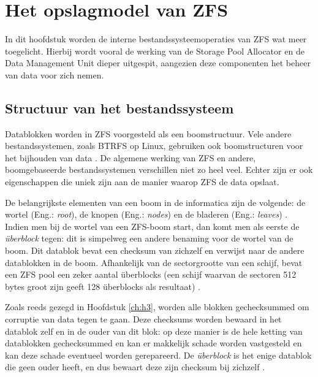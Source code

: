 

\chapter{Het opslagmodel van ZFS}
\label{ch:h4}

In dit hoofdstuk worden de interne bestandssysteemoperaties van ZFS wat meer toegelicht. Hierbij wordt vooral de werking van de Storage Pool Allocator en de Data Management Unit dieper uitgespit, aangezien deze componenten het beheer van data voor zich nemen.

\section{Structuur van het bestandssysteem}

Datablokken worden in ZFS voorgesteld als een boomstructuur. Vele andere bestandssystemen, zoals BTRFS op Linux, gebruiken ook boomstructuren voor het bijhouden van data \autocite{Project2017a}. De algemene werking van ZFS en andere, boomgebaseerde bestandssystemen verschillen niet zo heel veel. Echter zijn er ook eigenschappen die uniek zijn aan de manier waarop ZFS de data opslaat.

De belangrijkste elementen van een boom in de informatica zijn de volgende: de wortel (Eng.: \textit{root}), de knopen (Eng.: \textit{nodes}) en de bladeren (Eng.: \textit{leaves}) \autocite{Cohen}. Indien men bij de wortel van een ZFS-boom start, dan komt men als eerste de \textit{\"{u}berblock} tegen: dit is simpelweg een andere benaming voor de wortel van de boom. Dit datablok bevat een \gls{checksum} van zichzelf en verwijst naar de andere datablokken in de boom. Afhankelijk van de sectorgrootte van een schijf, bevat een ZFS pool een zeker aantal \"{u}berblocks (een schijf waarvan de sectoren 512 bytes groot zijn geeft 128 \"{u}berblocks als resultaat) \autocite{Lucas2015}. 

Zoals reeds gezegd in Hoofdstuk \ref{ch:h3}, worden alle blokken gechecksummed om corruptie van data tegen te gaan. Deze checksums worden bewaard in het datablok zelf en in de ouder van dit blok: op deze manier is de hele ketting van datablokken gechecksummed en kan er makkelijk schade worden vastgesteld en kan deze schade eventueel worden gerepareerd. De \textit{\"{u}berblock} is het enige datablok die geen ouder heeft, en dus bewaart deze zijn \gls{checksum} bij zichzelf \autocite{ZFSBonwick}.  

